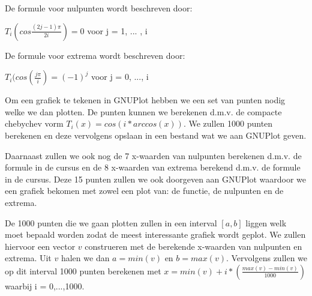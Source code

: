 \documentclass{article}
\begin{document}
\begin{flushleft}
De formule voor nulpunten wordt beschreven door:
\newline

$ T_{i}(cos \frac{(2j - 1)\pi}{2i}) = 0 $ voor j = 1, ... , i
\newline

De formule voor extrema wordt beschreven door:
\newline

$ T_{i}(cos(\frac{j\pi}{i}) = (-1)^{j} $ voor j = 0, ..., i
\newline

Om een grafiek te tekenen in GNUPlot hebben we een set van punten nodig welke we dan plotten. De punten kunnen we berekenen d.m.v. de compacte chebychev vorm $ T_{i}(x) = cos(i*arccos(x)) $. We zullen 1000 punten berekenen en deze vervolgens opslaan in een bestand wat we aan GNUPlot geven.
\newline

Daarnaast zullen we ook nog de 7 x-waarden van nulpunten berekenen d.m.v. de formule in de cursus en de 8 x-waarden van extrema berekend d.m.v. de formule in de cursus. Deze 15 punten zullen we ook doorgeven aan GNUPlot waardoor we een grafiek bekomen met zowel een plot van: de functie, de nulpunten en de extrema.
\newline

De 1000 punten die we gaan plotten zullen in een interval $[a, b]$ liggen welk moet bepaald worden zodat de meest interessante grafiek wordt geplot. We zullen hiervoor een vector $ v$ construeren met de berekende x-waarden van nulpunten en extrema. Uit $v$ halen we dan $a = min(v)$ en $b = max(v)$. Vervolgens zullen we op dit interval 1000 punten berekenen met $x = min(v) + i *(\frac{max(v)-min(v)}{1000})$ waarbij i = 0,...,1000.
\newline


\end{flushleft}
\end{document}

